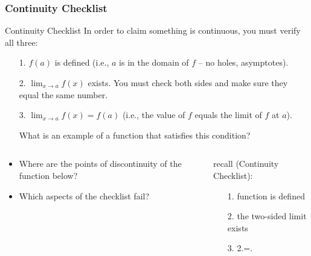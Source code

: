 \documentclass[cal1spr16Lectures.tex]{subfiles}
\begin{document}
\subsubsection{Continuity Checklist}

\begin{frame}{\small Continuity Checklist}\footnotesize
In order to claim something is continuous, you must verify all three:
\begin{itemize}
\item[1.] \alert{$f(a)$ is defined} (i.e., $a$ is in the domain of $f$ -- no holes, asymptotes).
\item[2.] \alert{$\displaystyle\lim_{x \to a} f(x)$ exists.}  You must check both sides and make sure they equal the same number.
\item[3.] \alert{$\displaystyle\lim_{x \to a} f(x) = f(a)$} (i.e., the value of $f$ equals the limit of $f$ at $a$).  
\begin{que} What is an example of a function that satisfies this condition? \end{que}
\end{itemize}
\end{frame}

\begin{frame}\footnotesize
\begin{columns}[T]
	\begin{column}{.65\textwidth}
		\begin{ex} \begin{itemize}
		\item Where are the points of discontinuity of the function below?  
		\item Which aspects of the checklist fail?
		\end{itemize}
		\end{ex}
	\end{column}
	\begin{column}{.4\textwidth}
	\vspace{8pc}
		recall (Continuity Checklist):
			\vspace{-1pc}
			\begin{itemize}
			\item[1.] function is defined
			\item[2.] the two-sided limit exists
			\item[3.] 2.\;=.
			\end{itemize}
	\end{column}
\end{columns}
\end{frame}
\end{document}
